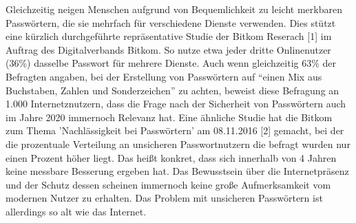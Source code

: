 Gleichzeitig neigen Menschen aufgrund von Bequemlichkeit zu leicht merkbaren Passwörtern, die sie mehrfach für verschiedene Dienste verwenden. Dies stützt eine kürzlich durchgeführte repräsentative Studie der Bitkom Reserach [1] im Auftrag des Digitalverbands Bitkom. So nutze etwa jeder dritte Onlinenutzer (36\%) dasselbe Passwort für mehrere Dienste. Auch wenn gleichzeitig 63\% der Befragten angaben, bei der Erstellung von Passwörtern auf ``einen Mix aus Buchstaben, Zahlen und Sonderzeichen'' zu achten, beweist diese Befragung an 1.000 Internetznutzern, dass die Frage nach der Sicherheit von Passwörtern auch im Jahre 2020 immernoch Relevanz hat. Eine ähnliche Studie hat die Bitkom zum Thema 'Nachlässigkeit bei Passwörtern' am 08.11.2016 [2] gemacht, bei der die prozentuale Verteilung an unsicheren Passwortnutzern die befragt wurden nur einen Prozent höher liegt. Das heißt konkret, dass sich innerhalb von 4 Jahren keine messbare Besserung ergeben hat. Das Bewusstsein über die Internetpräsenz und der Schutz dessen scheinen immernoch keine große Aufmerksamkeit vom modernen Nutzer zu erhalten. Das Problem mit unsicheren Passwörtern ist allerdings so alt wie das Internet.

